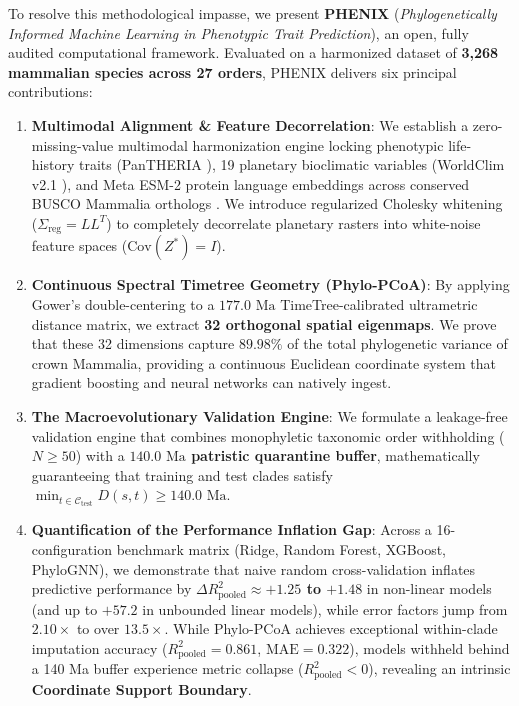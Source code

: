 \documentclass[sigconf,nonacm]{acmart}
\begin{document}
To resolve this methodological impasse, we present \textbf{PHENIX} (\textit{Phylogenetically Informed Machine Learning in Phenotypic Trait Prediction}), an open, fully audited computational framework. Evaluated on a harmonized dataset of \textbf{3,268 mammalian species across 27 orders}, PHENIX delivers six principal contributions:
\begin{enumerate}
    \item \textbf{Multimodal Alignment \& Feature Decorrelation}: We establish a zero-missing-value multimodal harmonization engine locking phenotypic life-history traits (PanTHERIA \cite{jones2009pantheria}), 19 planetary bioclimatic variables (WorldClim v2.1 \cite{fick2017worldclim}), and Meta ESM-2 protein language embeddings across conserved BUSCO Mammalia orthologs \cite{waterhouse2018busco}. We introduce regularized Cholesky whitening ($\Sigma_{\text{reg}} = L L^T$) to completely decorrelate planetary rasters into white-noise feature spaces ($\text{Cov}(Z^*) = I$).
    \item \textbf{Continuous Spectral Timetree Geometry (Phylo-PCoA)}: By applying Gower's double-centering to a $177.0\text{ Ma}$ TimeTree-calibrated ultrametric distance matrix, we extract \textbf{32 orthogonal spatial eigenmaps}. We prove that these 32 dimensions capture \textbf{$89.98\%$} of the total phylogenetic variance of crown Mammalia, providing a continuous Euclidean coordinate system that gradient boosting and neural networks can natively ingest.
    \item \textbf{The Macroevolutionary Validation Engine}: We formulate a leakage-free validation engine that combines monophyletic taxonomic order withholding ($N \ge 50$) with a \textbf{$140.0\text{ Ma}$ patristic quarantine buffer}, mathematically guaranteeing that training and test clades satisfy $\min_{t \in \mathcal{C}_{\text{test}}} D(s, t) \ge 140.0\text{ Ma}$.
    \item \textbf{Quantification of the Performance Inflation Gap}: Across a 16-configuration benchmark matrix (Ridge, Random Forest, XGBoost, PhyloGNN), we demonstrate that naive random cross-validation inflates predictive performance by \textbf{$\Delta R^2_{\text{pooled}} \approx +1.25$ to $+1.48$} in non-linear models (and up to $+57.2$ in unbounded linear models), while error factors jump from $2.10\times$ to over $13.5\times$. While Phylo-PCoA achieves exceptional within-clade imputation accuracy ($R^2_{\text{pooled}} = 0.861$, $\text{MAE} = 0.322$), models withheld behind a 140 Ma buffer experience metric collapse ($R^2_{\text{pooled}} < 0$), revealing an intrinsic \textbf{Coordinate Support Boundary}.

\end{enumerate}
\end{document}
